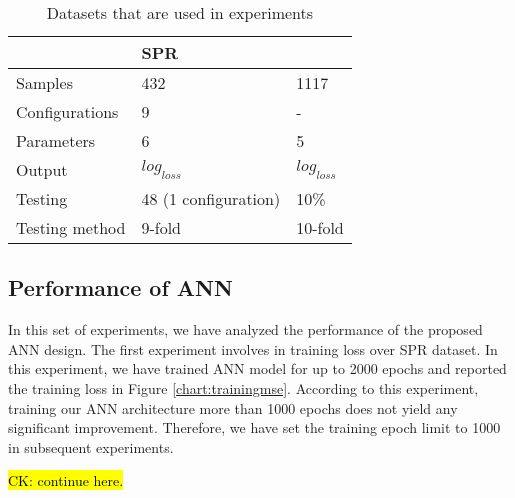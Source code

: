 \documentclass[draft, 10pt]{IEEEtran}
\begin{document}
\begin{table}
\centering
\caption{Datasets that are used in experiments}
\begin{tabular}{l|l|l}
	~ & SPR & \dszero \\\hline
	Samples & 432 & 1117\\
	Configurations & 9 & - \\
	Parameters & 6 & 5 \\
	Output & $log_{loss}$ & $log_{loss}$ \\
	Testing & 48 (1 configuration) & 10\% \\
	Testing method & 9-fold & 10-fold \\
\end{tabular}
\label{tbl:dataset}
\end{table}


\subsection{Performance of ANN}

In this set of experiments, we have analyzed the performance of the proposed ANN design. The first experiment involves in training loss over SPR dataset. In this experiment, we have trained ANN model for up to 2000 epochs and reported the training loss in Figure \ref{chart:trainingmse}. According to this experiment, training our ANN architecture more than 1000 epochs does not yield any significant improvement. Therefore, we have set the training epoch limit to 1000 in subsequent experiments.

\hl{CK: continue here.}

\begin{table*}[h]
\centering
{}
\caption{Hyper-parameters chosen for the ANN model, where $\beta_{1}$ and $\beta_{2}$ are a part of Adam parameters}
\end{table*}
\end{document}

